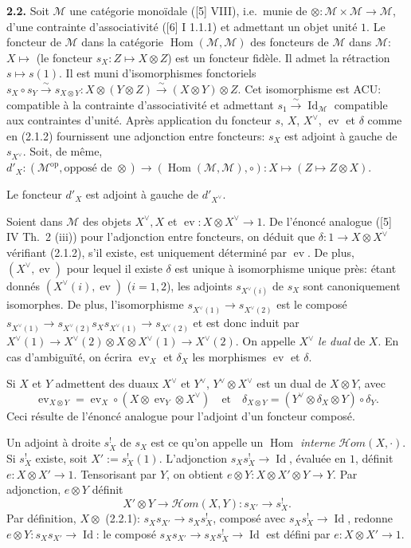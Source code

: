 \documentclass[12pt,a4paper]{article}
\theoremstyle{plain}
\theoremstyle{definition}
\theoremstyle{remark}
\DeclareMathOperator{\Hom}{Hom}
\DeclareMathOperator{\Id}{Id}
\DeclareMathOperator{\ev}{ev}
\begin{document}
\textbf{2.2.} Soit $\mathcal{M}$ une catégorie monoïdale ([5] VIII), i.e.~munie de $\otimes : \mathcal{M} \times \mathcal{M} \to \mathcal{M}$, d'une contrainte d'associativité ([6] I 1.1.1) et admettant un objet unité $1$. Le foncteur de $\mathcal{M}$ dans la catégorie $\Hom(\mathcal{M},\mathcal{M})$ des foncteurs de $\mathcal{M}$ dans $\mathcal{M}$: $X \mapsto$ (le foncteur $s_X : Z \mapsto X \otimes Z$) est un foncteur fidèle. Il admet la rétraction $s \mapsto s(1)$. Il est muni d'isomorphismes fonctoriels $s_X \circ s_Y \xrightarrow{\sim} s_{X \otimes Y} : X \otimes (Y \otimes Z) \xrightarrow{\sim} (X \otimes Y) \otimes Z$. Cet isomorphisme est ACU: compatible à la contrainte d'associativité et admettant $s_1 \xrightarrow{\sim} \Id_\mathcal{M}$ compatible aux contraintes d'unité. Après application du foncteur $s$, $X$, $X^\vee$, $\ev$ et $\delta$ comme en (2.1.2) fournissent une adjonction entre foncteurs: $s_X$ est adjoint à gauche de $s_{X^\vee}$. Soit, de même, $d'_X : (\mathcal{M}^\mathrm{op}, \text{opposé de } \otimes) \to (\Hom(\mathcal{M},\mathcal{M}), \circ) : X \mapsto (Z \mapsto Z \otimes X)$.

Le foncteur $d'_X$ est adjoint à gauche de $d'_{X^\vee}$.

Soient dans $\mathcal{M}$ des objets $X^\vee, X$ et $\ev : X \otimes X^\vee \to 1$. De l'énoncé analogue ([5] IV Th.~2 (iii)) pour l'adjonction entre foncteurs, on déduit que $\delta : 1 \to X \otimes X^\vee$ vérifiant (2.1.2), s'il existe, est uniquement déterminé par $\ev$. De plus, $(X^\vee, \ev)$ pour lequel il existe $\delta$ est unique à isomorphisme unique près: étant donnés $(X^\vee(i), \ev)$ ($i = 1,2$), les adjoints $s_{X^\vee(i)}$ de $s_X$ sont canoniquement isomorphes. De plus, l'isomorphisme $s_{X^\vee(1)} \to s_{X^\vee(2)}$ est le composé $s_{X^\vee(1)} \to s_{X^\vee(2)} s_X s_{X^\vee(1)} \to s_{X^\vee(2)}$ et est donc induit par $X^\vee(1) \to X^\vee(2) \otimes X \otimes X^\vee(1) \to X^\vee(2)$. On appelle $X^\vee$ \emph{le dual} de $X$. En cas d'ambiguïté, on écrira $\ev_X$ et $\delta_X$ les morphismes $\ev$ et $\delta$.

Si $X$ et $Y$ admettent des duaux $X^\vee$ et $Y^\vee$, $Y^\vee \otimes X^\vee$ est un dual de $X \otimes Y$, avec
\[
\ev_{X \otimes Y} = \ev_X \circ (X \otimes \ev_Y \otimes X^\vee) \quad \text{et} \quad \delta_{X \otimes Y} = (Y^\vee \otimes \delta_X \otimes Y) \circ \delta_Y.
\]
Ceci résulte de l'énoncé analogue pour l'adjoint d'un foncteur composé.

Un adjoint à droite $s_X^!$ de $s_X$ est ce qu'on appelle un \emph{$\Hom$ interne} $\mathcal{H}om(X,\cdot)$. Si $s_X^!$ existe, soit $X' := s_X^!(1)$. L'adjonction $s_X s_X^! \to \Id$, évaluée en $1$, définit $e : X \otimes X' \to 1$. Tensorisant par $Y$, on obtient $e \otimes Y : X \otimes X' \otimes Y \to Y$. Par adjonction, $e \otimes Y$ définit
\begin{equation}\label{eq:2.2.1}
X' \otimes Y \to \mathcal{H}om(X,Y) : s_{X'} \to s_X^!.
\end{equation}
Par définition, $X \otimes$ (2.2.1): $s_X s_{X'} \to s_X s_X^!$, composé avec $s_X s_X^! \to \Id$, redonne $e \otimes Y : s_X s_{X'} \to \Id$: le composé $s_X s_{X'} \to s_X s_X^! \to \Id$ est défini par $e : X \otimes X' \to 1$.
\end{document}
